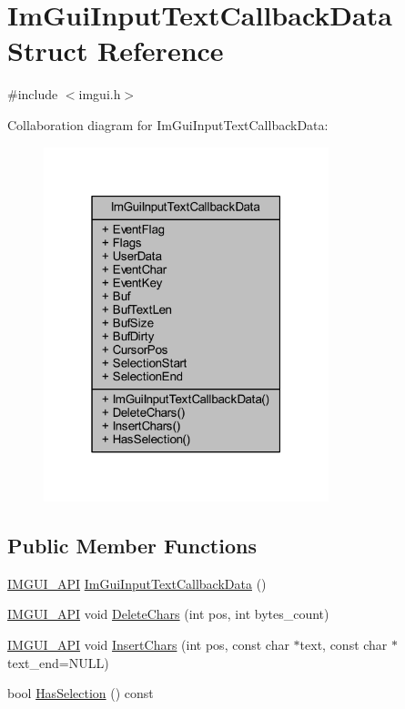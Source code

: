 \hypertarget{struct_im_gui_input_text_callback_data}{}\section{Im\+Gui\+Input\+Text\+Callback\+Data Struct Reference}
\label{struct_im_gui_input_text_callback_data}


{\ttfamily \#include $<$imgui.\+h$>$}



Collaboration diagram for Im\+Gui\+Input\+Text\+Callback\+Data\+:
\nopagebreak
\begin{figure}[H]
\begin{center}
\leavevmode
\includegraphics[width=235pt]{struct_im_gui_input_text_callback_data__coll__graph}
\end{center}
\end{figure}
\subsection*{Public Member Functions}
\begin{DoxyCompactItemize}
\item 
\mbox{\hyperlink{imgui_8h_a43829975e84e45d1149597467a14bbf5}{I\+M\+G\+U\+I\+\_\+\+A\+PI}} \mbox{\hyperlink{struct_im_gui_input_text_callback_data_ae19641bad15c1a163928d121075ca09c}{Im\+Gui\+Input\+Text\+Callback\+Data}} ()
\item 
\mbox{\hyperlink{imgui_8h_a43829975e84e45d1149597467a14bbf5}{I\+M\+G\+U\+I\+\_\+\+A\+PI}} void \mbox{\hyperlink{struct_im_gui_input_text_callback_data_ab5dc30d7edcf60efbd5bb8e677dab8bf}{Delete\+Chars}} (int pos, int bytes\+\_\+count)
\item 
\mbox{\hyperlink{imgui_8h_a43829975e84e45d1149597467a14bbf5}{I\+M\+G\+U\+I\+\_\+\+A\+PI}} void \mbox{\hyperlink{struct_im_gui_input_text_callback_data_a9963937f48aba00466c2af404dad1e25}{Insert\+Chars}} (int pos, const char $\ast$text, const char $\ast$text\+\_\+end=N\+U\+LL)
\item 
bool \mbox{\hyperlink{struct_im_gui_input_text_callback_data_aae1b69a904053961be171d7f47ef430e}{Has\+Selection}} () const
\end{DoxyCompactItemize}
